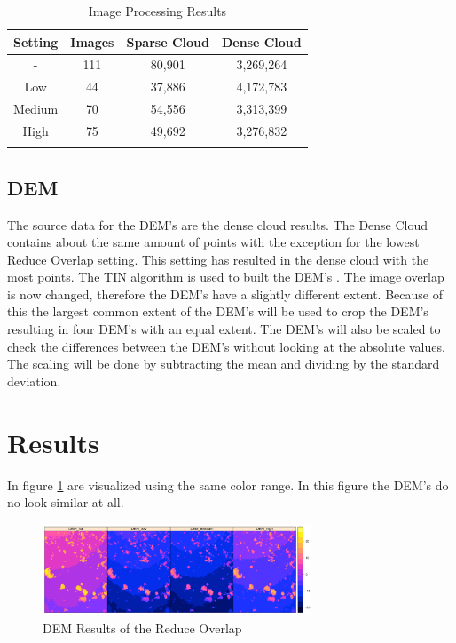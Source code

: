 \documentclass{isprs} %
\begin{document}
\begin{table}[htb]
    \centering
    \caption{Image Processing Results}
    \begin{tabular}{@{}cccc@{}}
    \toprule
    \textbf{Setting} & \textbf{Images} & \multicolumn{1}{l}{\textbf{Sparse Cloud}} & \multicolumn{1}{l}{\textbf{Dense Cloud}} \\ \midrule
    -      & 111 & 80,901 & 3,269,264 \\
    Low    & 44  & 37,886 & 4,172,783 \\
    Medium & 70  & 54,556 & 3,313,399 \\
    High   & 75  & 49,692 & 3,276,832 \\ \bottomrule
    \label{tab:ImageProcessing}
\end{tabular}
\end{table}

\subsection{DEM}
The source data for the DEM's are the dense cloud results. 
The Dense Cloud contains about the same amount of points with the exception for the lowest Reduce Overlap setting.
This setting has resulted in the dense cloud with the most points.
The TIN algorithm is used to built the DEM's \citep{axelsson1999processing}.
The image overlap is now changed, therefore the DEM's have a slightly different extent.
Because of this the largest common extent of the DEM's will be used to crop the DEM's resulting in four DEM's with an equal extent.
The DEM's will also be scaled to check the differences between the DEM's without looking at the absolute values.
The scaling will be done by subtracting the mean and dividing by the standard deviation.


\section{Results}
In figure \ref{fig:DemPlot_unscaled} are visualized using the same color range. 
In this figure the DEM's do no look similar at all.


\begin{figure}[htp]
    \centering
    \includegraphics[width=8cm]{DemPlots.png}
    \caption{DEM Results of the Reduce Overlap}
    \label{fig:DemPlot_unscaled}
\end{figure}
\end{document}
